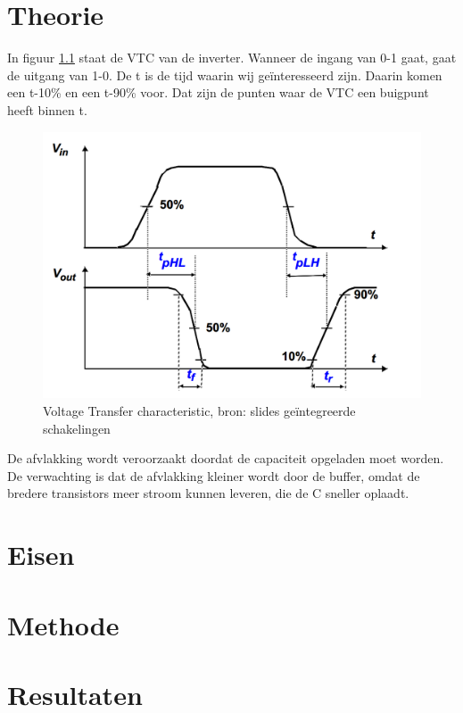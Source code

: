 \documentclass{report}
\begin{document}
\chapter{Theorie}
In figuur \ref{Th1} staat de VTC van de inverter. Wanneer de ingang van 0-1 gaat, gaat de uitgang van 1-0. De t is de tijd waarin wij geïnteresseerd zijn. Daarin komen een t-10\% en een t-90\% voor. Dat zijn de punten waar de VTC een buigpunt heeft binnen t. 
\begin{figure} [h!]
\includegraphics [scale= 0.3] {inputfiles/vtc}
\caption{Voltage Transfer characteristic, bron: slides geïntegreerde schakelingen}
\label{Th1}
\end{figure}
De afvlakking wordt veroorzaakt doordat de capaciteit opgeladen moet worden. De verwachting is dat de afvlakking kleiner wordt door de buffer, omdat de bredere transistors meer stroom kunnen leveren, die de C sneller oplaadt. 



\chapter{Eisen}


\chapter{Methode}


\chapter{Resultaten}

\end{document}
